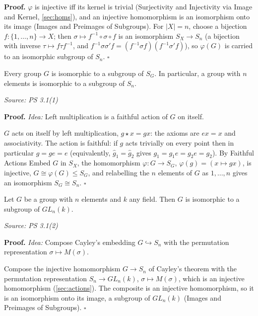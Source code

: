 \documentclass[11pt]{report}
\renewenvironment{proof}[1][Proof]{\noindent\textbf{#1.} }{\hfill$\square$\par\vspace{5pt}}
\newcommand{\srcline}[1]{\par\hfill{\footnotesize\textit{Source: #1}}}
\begin{document}
\begin{proof}
$\varphi$ is injective iff its kernel is trivial (Surjectivity and Injectivity via Image and Kernel, \ref{sec:homs}), and an injective homomorphism is an isomorphism onto its image (Images and Preimages of Subgroups). For $|X| = n$, choose a bijection $f: \{1, \ldots, n\} \to X$; then $\sigma \mapsto f^{-1} \circ \sigma \circ f$ is an isomorphism $S_X \to S_n$ (a bijection with inverse $\tau \mapsto f \tau f^{-1}$, and $f^{-1}\sigma\sigma' f = (f^{-1}\sigma f)(f^{-1}\sigma' f)$), so $\varphi(G)$ is carried to an isomorphic subgroup of $S_n$.
\end{proof}

\begin{thmbox}\label{thm:cayleys-theorem}
Every group $G$ is isomorphic to a subgroup of $S_G$. In particular, a group with $n$ elements is isomorphic to a subgroup of $S_n$.
\srcline{PS 3.1(1)}
\end{thmbox}

\begin{proof}
\textit{Idea:} Left multiplication is a faithful action of $G$ on itself.\par
$G$ acts on itself by left multiplication, $g \star x = gx$: the axioms are $ex = x$ and associativity. The action is faithful: if $g$ acts trivially on every point then in particular $g = ge = e$ (equivalently, $\hat g_1 = \hat g_2$ gives $g_1 = g_1e = g_2e = g_2$). By Faithful Actions Embed $G$ in $S_X$, the homomorphism $\varphi: G \to S_G$, $\varphi(g) = (x \mapsto gx)$, is injective, $G \cong \varphi(G) \leq S_G$, and relabelling the $n$ elements of $G$ as $1, \ldots, n$ gives an isomorphism $S_G \cong S_n$.
\end{proof}

\begin{corbox}\label{cor:every-finite-group-matrix-group}
Let $G$ be a group with $n$ elements and $k$ any field. Then $G$ is isomorphic to a subgroup of $GL_n(k)$.
\srcline{PS 3.1(2)}
\end{corbox}

\begin{proof}
\textit{Idea:} Compose Cayley's embedding $G \hookrightarrow S_n$ with the permutation representation $\sigma \mapsto M(\sigma)$.\par
Compose the injective homomorphism $G \to S_n$ of Cayley's theorem with the permutation representation $S_n \to GL_n(k)$, $\sigma \mapsto M(\sigma)$, which is an injective homomorphism (\ref{sec:actions}). The composite is an injective homomorphism, so it is an isomorphism onto its image, a subgroup of $GL_n(k)$ (Images and Preimages of Subgroups).
\end{proof}
\end{document}
